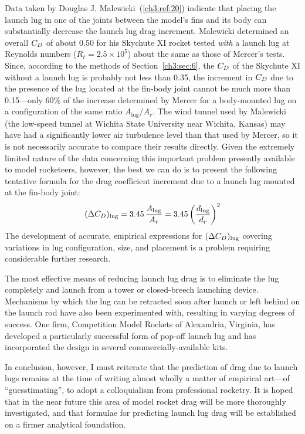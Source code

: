 Data taken by Douglas J. Malewicki~(\ref{ch3:ref:20}) indicate that placing the
launch lug in one of the joints between the model's fins and its body can
substantially decrease the launch lug drag increment. Malewicki determined an
overall $C_{D}$ of about 0.50 for his Skychute XI rocket tested \emph{with} a
launch lug at Reynolds numbers ($R_\ell = 2.5 \times 10^{5}$) about the same as
those of Mercer's tests. Since, according to the methods of
Section~\ref{ch3:sec:6}, the $C_{D}$ of the Skychute XI without a launch lug is
probably not less than 0.35, the increment in $C_{D}$ due to the presence of the
lug located at the fin-body joint cannot be much more than 0.15---only 60\% of
the increase determined by Mercer for a body-mounted lug on a configuration of
the same ratio $A_{\mathrm{lug}}/A_r$. The wind tunnel used by Malewicki (the
low-speed tunnel at Wichita State University near Wichita, Kansas) may have
had a significantly lower air turbulence level than that used by Mercer, so it
is not necessarily accurate to compare their results directly. Given the
extremely limited nature of the data concerning this important problem
presently available to model rocketeers, however, the best we can do is to
present the following tentative formula for the drag coefficient increment due
to a launch lug mounted at the fin-body joint:
\begin{equation}\label{ch3:eq:120}
(\Delta C_{D})_{\mathrm{lug}} = 3.45\,\frac{A_{\mathrm{lug}}}{A_r}
  = 3.45\left(\frac{d_{\mathrm{lug}}}{d_r}\right)^{2}
\end{equation}
The development of accurate, empirical expressions for
$(\Delta C_{D})_{\mathrm{lug}}$ covering variations in lug configuration, size,
and placement is a problem requiring considerable further research.

The most effective means of reducing launch lug drag is to eliminate the lug
completely and launch from a tower or closed-breech launching device.
Mechanisms by which the lug can be retracted soon after launch or left behind
on the launch rod have also been experimented with, resulting in varying
degrees of success. One firm, Competition Model Rockets of Alexandria,
Virginia, has developed a particularly successful form of pop-off launch lug
and has incorporated the design in several commercially-available kits.

In conclusion, however, I must reiterate that the prediction of drag due to
launch lugs remains at the time of writing almost wholly a matter of empirical
art---of ``guesstimating'', to adopt a colloquialism from professional
rocketry. It is hoped that in the near future this area of model rocket drag
will be more thoroughly investigated, and that formulae for predicting launch
lug drag will be established on a firmer analytical foundation.

